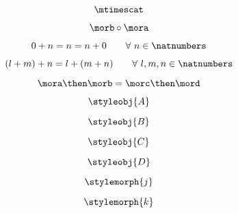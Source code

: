 {\begin{forslides}
		\begin{equation}
			\label{eq:42}
			\mtimescat
		\end{equation}

		\begin{equation}
			\label{eq:43}
			\morb \circ \mora
		\end{equation}

		\begin{equation}
			\label{eq:44}
			0 + n = n = n + 0   \quad \quad \forall \ n \in \natnumbers
		\end{equation}

		\begin{equation}
			\label{eq:45}
			(l + m) + n = l + (m + n) \quad \quad  \forall \ l, m, n \in \natnumbers
		\end{equation}

		\begin{equation}
			\label{eq:46}
			\mora \then \morb = \morc \then \mord
		\end{equation}

		\begin{equation}
			\label{eq:47}
			\styleobj{A}
		\end{equation}

		\begin{equation}
			\label{eq:48}
			\styleobj{B}
		\end{equation}

		\begin{equation}
			\label{eq:49}
			\styleobj{C}
		\end{equation}

		\begin{equation}
			\label{eq:50}
			\styleobj{D}
		\end{equation}

		\begin{equation}
			\label{eq:51}
			\stylemorph{j}
		\end{equation}

		\begin{equation}
			\label{eq:52}
			\stylemorph{k}
		\end{equation}

	\end{forslides}
}

